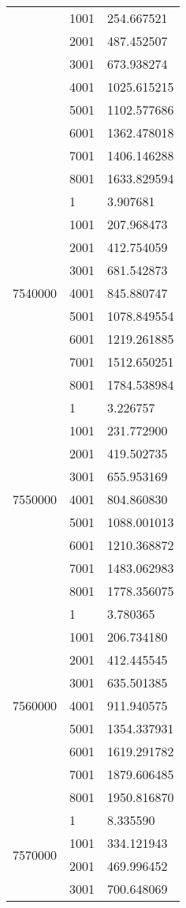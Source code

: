 \begin{table}[htb!]
\begin{tabular}{lll}
 & 1001 & 254.667521 \\
 & 2001 & 487.452507 \\
 & 3001 & 673.938274 \\
 & 4001 & 1025.615215 \\
 & 5001 & 1102.577686 \\
 & 6001 & 1362.478018 \\
 & 7001 & 1406.146288 \\
 & 8001 & 1633.829594 \\
\multirow[c]{9}{*}{7540000} & 1 & 3.907681 \\
 & 1001 & 207.968473 \\
 & 2001 & 412.754059 \\
 & 3001 & 681.542873 \\
 & 4001 & 845.880747 \\
 & 5001 & 1078.849554 \\
 & 6001 & 1219.261885 \\
 & 7001 & 1512.650251 \\
 & 8001 & 1784.538984 \\
\multirow[c]{9}{*}{7550000} & 1 & 3.226757 \\
 & 1001 & 231.772900 \\
 & 2001 & 419.502735 \\
 & 3001 & 655.953169 \\
 & 4001 & 804.860830 \\
 & 5001 & 1088.001013 \\
 & 6001 & 1210.368872 \\
 & 7001 & 1483.062983 \\
 & 8001 & 1778.356075 \\
\multirow[c]{9}{*}{7560000} & 1 & 3.780365 \\
 & 1001 & 206.734180 \\
 & 2001 & 412.445545 \\
 & 3001 & 635.501385 \\
 & 4001 & 911.940575 \\
 & 5001 & 1354.337931 \\
 & 6001 & 1619.291782 \\
 & 7001 & 1879.606485 \\
 & 8001 & 1950.816870 \\
\multirow[c]{9}{*}{7570000} & 1 & 8.335590 \\
 & 1001 & 334.121943 \\
 & 2001 & 469.996452 \\
 & 3001 & 700.648069 \\

\end{tabular}
\end{table}
